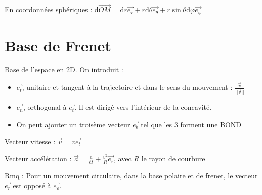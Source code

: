 \documentclass[french]{yLectureNote}
\renewcommand{\vec}{\overrightarrow}
\newcommand{\norm}[1]{||\vec{#1}||}
\begin{document}
En coordonnées sphériques : $\mathrm{d} \vec{OM} = \mathrm{d}r \vec{e_r} + r\mathrm{d}\theta \vec{e_{\theta}} + r\sin\theta \mathrm{d}\varphi \vec{e_{\varphi}}$

\section{Base de Frenet}
Base de l'espace en 2D. On introduit :
\begin{itemize}
 \item $\vec{e_t}$, unitaire et tangent à la trajectoire et dans le sens du mouvement : $\frac{\vec{v}}{\norm{v}}$
 \item $\vec{e_n}$, orthogonal à $\vec{e_t}$. Il est dirigé vers l'intérieur de la concavité.
 \item On peut ajouter un troisème vecteur $\vec{e_b}$ tel que les 3 forment une BOND
\end{itemize}
Vecteur vitesse : $\vec{v} = v\vec{e_t}$

Vecteur accélération : $\vec{a} = \frac{\mathrm{d}}{\mathrm{d}t} + \frac{v^2}{R}\vec{e_r}$, avec $R$ le rayon de courbure

Rmq : Pour un mouvement circulaire, dans la base polaire et de frenet, le vecteur $\vec{e_r}$ est opposé à $\vec{e_{\rho}}$.
\end{document}
